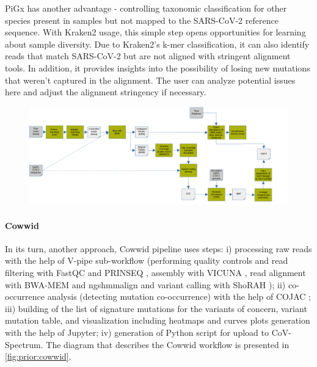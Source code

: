         PiGx has another advantage - controlling taxonomic classification for other species present in samples but not mapped to the SARS-CoV-2 reference sequence. With Kraken2 usage, this simple step opens opportunities for learning about sample diversity. Due to Kraken2's k-mer classification, it can also identify reads that match SARS-CoV-2 but are not aligned with stringent alignment tools. In addition, it provides insights into the possibility of losing new mutations that weren't captured in the alignment. The user can analyze potential issues here and adjust the alignment stringency if necessary.
        \begin{landscape}
        \centering\vspace*{\fill}
        \begin{figure}[H]
        	\centering
            \includegraphics[width=1.5\textwidth]{figures/prior/pigx.png}
            \label{fig:prior:pigx}
        \end{figure}
        \vfill
        \end{landscape}

        \paragraph{Cowwid}
        In its turn, another approach, Cowwid \cite{jahn2021} pipeline uses steps: i) processing raw reads with the help of V-pipe \cite{posada2021} sub-workflow (performing quality controls and read filtering with FastQC and PRINSEQ \cite{babraham,prinseq}, assembly with VICUNA \cite{vicuna2012}, read alignment with BWA-MEM and ngshmmalign \cite{li2013,ngshmmalign2021} and variant calling with ShoRAH \cite{shorah}); ii) co-occurrence analysis (detecting mutation co-occurrence) with the help of COJAC \cite{jahn2022,cojac2022}; iii) building of the list of signature mutations for the variants of concern, variant mutation table, and visualization including heatmaps and curves plots generation with the help of Jupyter; iv) generation of Python script for upload to CoV-Spectrum. The diagram that describes the Cowwid workflow is presented in \cref{fig:prior:cowwid}.
        
